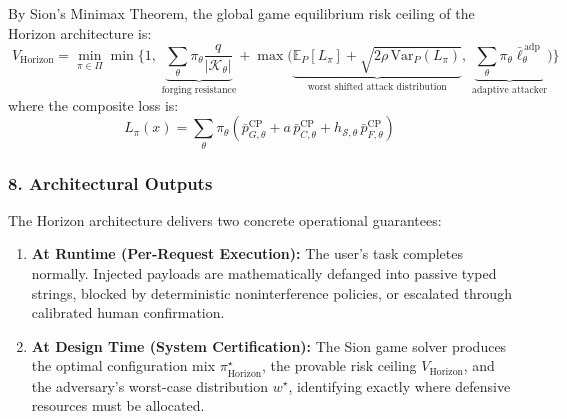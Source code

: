 By Sion's Minimax Theorem, the global game equilibrium risk ceiling of the Horizon architecture is:
\begin{equation}
    \boxed{\;
    V_{\mathrm{Horizon}} = \min_{\pi \in \Pi} \min\Bigg\{1,\;
    \underbrace{\sum_\theta \pi_\theta \frac{q}{|\mathcal{K}_\theta|}}_{\text{forging resistance}}
    + \max\Big(
    \underbrace{\mathbb{E}_P[L_\pi] + \sqrt{2\rho\,\mathrm{Var}_P(L_\pi)}}_{\text{worst shifted attack distribution}},\;
    \underbrace{\sum_\theta \pi_\theta \bar{\ell}^{\,\mathrm{adp}}_\theta}_{\text{adaptive attacker}}
    \Big)\Bigg\}\;}
\end{equation}
where the composite loss is:
\begin{equation}
    L_\pi(x) = \sum_\theta \pi_\theta \left(\bar{p}^{\mathrm{CP}}_{G,\theta} + a\,\bar{p}^{\mathrm{CP}}_{C,\theta} + h_{\mathcal{S},\theta}\,\bar{p}^{\mathrm{CP}}_{F,\theta}\right)
\end{equation}

\subsubsection{8. Architectural Outputs}
The Horizon architecture delivers two concrete operational guarantees:
\begin{enumerate}
    \item \textbf{At Runtime (Per-Request Execution):} The user's task completes normally. Injected payloads are mathematically defanged into passive typed strings, blocked by deterministic noninterference policies, or escalated through calibrated human confirmation.
    \item \textbf{At Design Time (System Certification):} The Sion game solver produces the optimal configuration mix $\pi^\star_{\mathrm{Horizon}}$, the provable risk ceiling $V_{\mathrm{Horizon}}$, and the adversary's worst-case distribution $w^\star$, identifying exactly where defensive resources must be allocated.
\end{enumerate}
